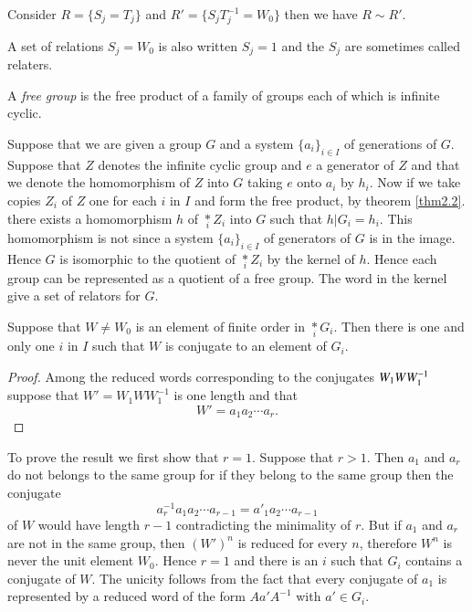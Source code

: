 \begin{example*}
Consider $R=\{ S_j=T_j \}$ and $R'= \{ S_j T^{-1}_j=W_0 \}$ then we
have $R \sim R'$. 

A set of relations $S_j=W_0$ is also written $S_j=1$ and the $S_j$ are
sometimes called relaters. 
\end{example*}

\begin{defi*}
A {\em free group} is the free product of a family of groups each of
which is infinite cyclic. 
\end{defi*}

Suppose that we are given a group $G$ and a system $\{ a_i \}_{i \in
  I}$ of generations of $G$. Suppose that $Z$ denotes the infinite
cyclic group and $e$ a generator of $Z$ and that we denote the
homomorphism of $Z$ into $G$ taking $e$ onto $a_i$ by $h_i$. Now if we
take copies $Z_i$ of $Z$ one for each $i$ in $I$ and form the free
product, by theorem \ref{thm2.2}. there exists a homomorphism $h$
of\pageoriginale 
$\underset{i}{\ast} Z_i$ into $G$ such that $h|G_i=h_i$. This homomorphism
is not since a system $\{ a_i \}_{i \in I}$ of generators of $G$ is in
the image. Hence $G$ is isomorphic to the quotient of $\underset{i}{\ast}
Z_i$ by the kernel of $h$. Hence each group can be represented as a
quotient of a free group. The word in the kernel give a set of
relators for $G$. 

\begin{theorem}\label{thm2.3} %
Suppose that $W \neq W_0$ is an element of finite order in
  $\underset{i}* G_i$. Then there is one and only one $i$ in $I$ such
  that $W$ is conjugate to an element of $G_i$. 
\end{theorem}

\begin{proof}
Among the reduced words corresponding to the conjugates $W_1\break WW^{-1}_1$
suppose that $W'=W_1 W W^{-1}_1$ is one length and that 
$$
W'=a_1a_2 \cdots a_r.
$$
\end{proof}

To prove the result we first show that $r=1$. Suppose that $r
>1$. Then $a_1$ and $a_r$ do not belongs to the same group for if they
belong to the same group then the conjugate 
$$
a^{-1}_ra_1a_2 \cdots a_{r-1}=a'_1a_2 \cdots a_{r-1} 
$$
of $W$ would have length $r-1$ contradicting the minimality of
$r$. But if $a_1$ and $a_r$ are not in the same group, then $(W')^n$
is reduced for every $n$, therefore $W^n$ is never the unit element
$W_0$. Hence $r=1$ and there is an $i$ such that $G_i$ contains a
conjugate of $W$. The unicity follows from the fact that every
conjugate of $a_1$ is represented by a reduced word of the form $Aa'
A^{-1}$ with $a' \in G_i$. 

